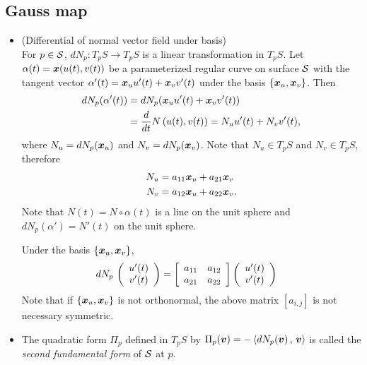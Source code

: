 \documentclass[11pt]{article}
\begin{document}
\subsection{Gauss map}
\begin{itemize}
\item (Differential of normal vector field under basis)\\
For $p\in {\mathcal S}$, $dN_{p}: T_{p}S \rightarrow T_{p}S$ is a linear transformation in $T_{p}S$. Let $\alpha(t) = \boldsymbol{x}(u(t), v(t))$ be a parameterized regular curve on surface ${\mathcal S}$ with the tangent vector $\alpha'(t) = \boldsymbol{x}_{u}u'(t) + \boldsymbol{x}_{v}v'(t) $ under the basis $\left\{\boldsymbol{x}_{u}, \boldsymbol{x}_{v}\right\}$. Then 
\begin{align}
dN_{p}(\alpha'(t)) &= dN_{p}( \boldsymbol{x}_{u}u'(t) + \boldsymbol{x}_{v}v'(t) )\nonumber\\
&= \dfrac{d}{dt}N\left(u(t), v(t)\right) = N_{u}u'(t) + N_{v}v'(t), \label{eqn: Gauss_map}
\end{align} where $N_{u} = dN_{p}( \boldsymbol{x}_{u})$ and  $N_{v} = dN_{p}( \boldsymbol{x}_{v})$. Note that $N_{u} \in T_{p}S$ and $N_{v} \in T_{p}S$, therefore
\begin{align}
N_{u}&= a_{11}\boldsymbol{x}_{u} + a_{21}\boldsymbol{x}_{v}\nonumber\\
N_{v}&= a_{12}\boldsymbol{x}_{u} + a_{22}\boldsymbol{x}_{v}. \label{eqn: Gauss_map_comp}
\end{align}
Note that $N(t) = N\circ \alpha(t)$ is a line on the unit sphere and $dN_{p}(\alpha') = N'(t)$ on the unit sphere. 

Under the basis $\left\{\boldsymbol{x}_{u}, \boldsymbol{x}_{v}\right\}$, 
\begin{align}
dN_{p}\,\left(\begin{array}{c}
u'(t)  \\ 
v'(t) 
\end{array} \right) &= 
\left[\begin{array}{cc}
a_{11} & a_{12} \\ 
a_{21} & a_{22}
\end{array} \right]\left(\begin{array}{c}
u'(t)  \\ 
v'(t) 
\end{array} \right)  \label{eqn: Gauss_map_coord}
\end{align}
Note that if $\left\{\boldsymbol{x}_{u}, \boldsymbol{x}_{v}\right\}$ is not orthonormal, the above matrix $[a_{i,j}]$ is not necessary symmetric. \\


\item The quadratic form $\Pi_{p}$ defined in $T_{p}S$ by $\Pi_{p}(\boldsymbol{v}) = -\left\langle dN_{p}(\boldsymbol{v})\,,\, \boldsymbol{v} \right\rangle$ is called the \emph{second fundamental form} of ${\mathcal S}$ at $p$.


\end{itemize}
\end{document}
